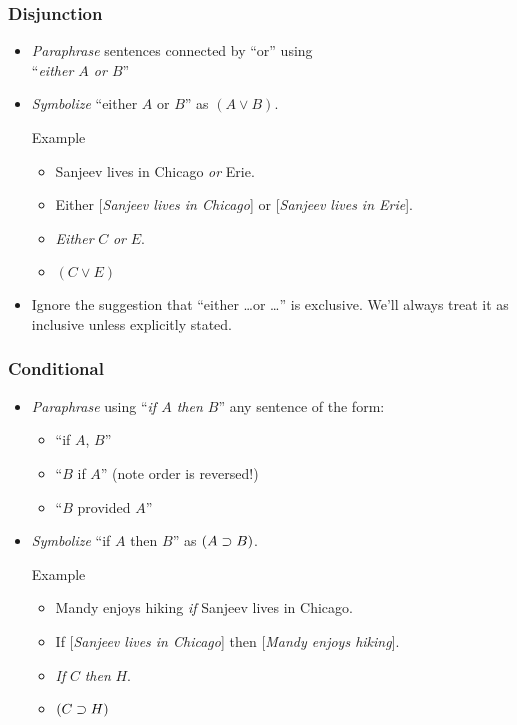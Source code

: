 \begin{frame}
  \frametitle{Disjunction}

  \begin{itemize}[<+->]
  \item \emph{Paraphrase} sentences connected by ``or'' using\\
  ``\emph{either $A$ or $B$}''

  \item \emph{Symbolize} ``either $A$ or $B$'' as
  \emph{$(A \lor B)$}.

  \begin{block}{Example}
  \begin{itemize}[<+->]
  \item[] Sanjeev lives in Chicago \emph{or} Erie.

  \item[] Either [\emph{Sanjeev lives in Chicago}] or [\emph{Sanjeev lives in Erie}].

  \item[] \emph{Either} $C$ \emph{or} $E$.

  \item[] $(C \lor E)$
  \end{itemize}
  \end{block}
  
  \item[] Ignore the suggestion that ``either \dots or \dots'' is exclusive.
  We'll always treat it as inclusive unless explicitly stated.
\end{itemize}

\end{frame}

\begin{frame}
  \frametitle{Conditional}

  \begin{itemize}[<+->]
  \item \emph{Paraphrase} using ``\emph{if $A$ then $B$}'' any sentence of the form:
  \begin{itemize}[<+->]
  \item ``if $A$, $B$''
  \item ``$B$ if $A$'' (note order is reversed!)
  \item ``$B$ provided $A$''
  \end{itemize}
  \item \emph{Symbolize} ``if $A$ then $B$'' as
  \emph{$(A \supset B)$}.

  \begin{block}{Example}
  \begin{itemize}[<+->]
  \item Mandy enjoys hiking \emph{if} Sanjeev lives in Chicago.

  \item If [\emph{Sanjeev lives in Chicago}] then [\emph{Mandy enjoys hiking}].

  \item \emph{If} $C$ \emph{then} $H$.

  \item $(C \supset H)$
  \end{itemize}
  \end{block}
  \end{itemize}
\end{frame}

